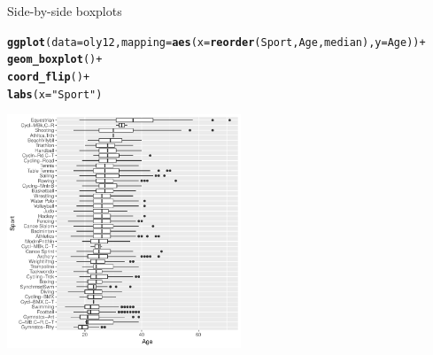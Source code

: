 \documentclass[10pt]{beamer}\usepackage[]{graphicx}\usepackage[]{color}
\makeatletter
\newcommand{\hlstr}[1]{\textcolor[rgb]{0.192,0.494,0.8}{#1}}%
\newcommand{\hlopt}[1]{\textcolor[rgb]{0,0,0}{#1}}%
\newcommand{\hlstd}[1]{\textcolor[rgb]{0.345,0.345,0.345}{#1}}%
\newcommand{\hlkwc}[1]{\textcolor[rgb]{0.333,0.667,0.333}{#1}}%
\newcommand{\hlkwd}[1]{\textcolor[rgb]{0.737,0.353,0.396}{\textbf{#1}}}%
\newenvironment{kframe}{%
 \def\at@end@of@kframe{}%
 \ifinner\ifhmode%
  \def\at@end@of@kframe{\end{minipage}}%
  \begin{minipage}{\columnwidth}%
 \fi\fi%
 \def\FrameCommand##1{\hskip\@totalleftmargin \hskip-\fboxsep
 \colorbox{shadecolor}{##1}\hskip-\fboxsep
     \hskip-\linewidth \hskip-\@totalleftmargin \hskip\columnwidth}%
 \MakeFramed {\advance\hsize-\width
   \@totalleftmargin\z@ \linewidth\hsize
   \@setminipage}}%
 {\par\unskip\endMakeFramed%
 \at@end@of@kframe}
\newenvironment{knitrout}{}{} %
\makeatother
\begin{document}
\begin{frame}[fragile]{Side-by-side boxplots}

\begin{knitrout}\scriptsize
{}\color{fgcolor}\begin{kframe}
\begin{alltt}
\hlkwd{ggplot}\hlstd{(}\hlkwc{data} \hlstd{= oly12,} \hlkwc{mapping} \hlstd{=} \hlkwd{aes}\hlstd{(}\hlkwc{x} \hlstd{=} \hlkwd{reorder}\hlstd{(Sport, Age, median),} \hlkwc{y} \hlstd{= Age))} \hlopt{+}
  \hlkwd{geom_boxplot}\hlstd{()} \hlopt{+}
  \hlkwd{coord_flip}\hlstd{()} \hlopt{+}
  \hlkwd{labs}\hlstd{(}\hlkwc{x} \hlstd{=} \hlstr{"Sport"}\hlstd{)}
\end{alltt}
\end{kframe}
\includegraphics[width=2.75in,height=2.75in]{figure/unnamed-chunk-10-1} 

\end{knitrout}

\end{frame}
\end{document}
